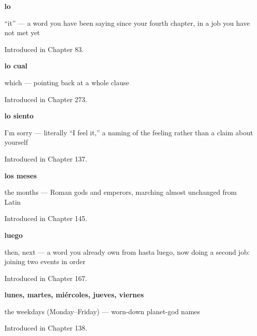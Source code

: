 \noindent\begin{minipage}[t]{\linewidth}
\raggedright
\textbf{lo}\par
\small \textquotedblleft{}it\textquotedblright{} — a word you have been saying since your fourth chapter, in a job you have not met yet\par
\footnotesize Introduced in Chapter 83.
\end{minipage}\par\medskip

\noindent\begin{minipage}[t]{\linewidth}
\raggedright
\textbf{lo cual}\par
\small which — pointing back at a whole clause\par
\footnotesize Introduced in Chapter 273.
\end{minipage}\par\medskip

\noindent\begin{minipage}[t]{\linewidth}
\raggedright
\textbf{lo siento}\par
\small I'm sorry — literally \textquotedblleft{}I feel it,\textquotedblright{} a naming of the feeling rather than a claim about yourself\par
\footnotesize Introduced in Chapter 137.
\end{minipage}\par\medskip

\noindent\begin{minipage}[t]{\linewidth}
\raggedright
\textbf{los meses}\par
\small the months — Roman gods and emperors, marching almost unchanged from Latin\par
\footnotesize Introduced in Chapter 145.
\end{minipage}\par\medskip

\noindent\begin{minipage}[t]{\linewidth}
\raggedright
\textbf{luego}\par
\small then, next — a word you already own from hasta luego, now doing a second job: joining two events in order\par
\footnotesize Introduced in Chapter 167.
\end{minipage}\par\medskip

\noindent\begin{minipage}[t]{\linewidth}
\raggedright
\textbf{lunes, martes, miércoles, jueves, viernes}\par
\small the weekdays (Monday–Friday) — worn-down planet-god names\par
\footnotesize Introduced in Chapter 138.
\end{minipage}\par\medskip

